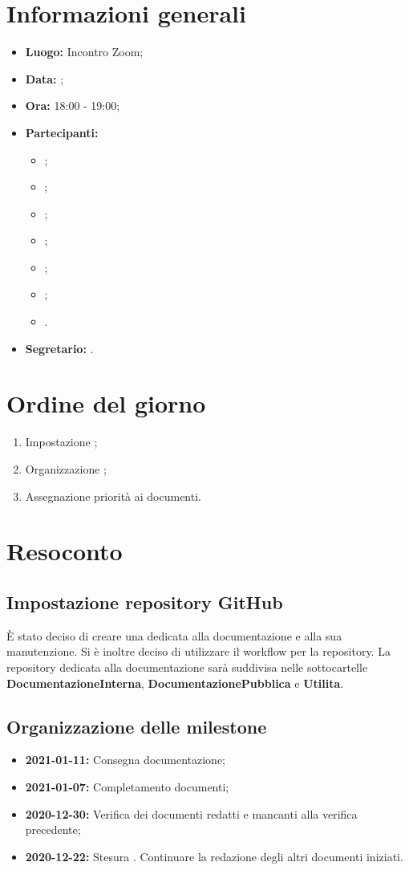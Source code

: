 \section{Informazioni generali}
\begin{itemize}
\item \textbf{Luogo:} Incontro Zoom;
\item \textbf{Data:} \Data;
\item \textbf{Ora:} 18:00 - 19:00;
\item \textbf{Partecipanti:}
	\begin{itemize}
		\item \BL{}; 
		\item \FF{};
		\item \MM{}; 
		\item \PC{};
		\item \TG{};
		\item \TL{};
		\item \VD{}.
	\end{itemize} 
\item \textbf{Segretario:} \PC{}.
\end{itemize}

\section{Ordine del giorno}
\begin{enumerate}
 \item Impostazione  ;
 \item Organizzazione ;
 \item Assegnazione priorità ai documenti.
\end{enumerate}

\section{Resoconto}
\subsection{Impostazione repository GitHub}
È stato deciso di creare una  dedicata alla documentazione e alla sua manutenzione. Si è inoltre deciso di utilizzare il workflow  per la repository. La repository dedicata alla documentazione sarà suddivisa nelle sottocartelle \textbf{DocumentazioneInterna}, \textbf{DocumentazionePubblica} e \textbf{Utilita}.
\subsection{Organizzazione delle milestone}
 \begin{itemize}
  \item \textbf{2021-01-11:} Consegna documentazione;
  \item \textbf{2021-01-07:} Completamento documenti;
  \item \textbf{2020-12-30:} Verifica dei documenti redatti e mancanti alla verifica precedente;
  \item \textbf{2020-12-22:} Stesura \PdP. Continuare la redazione degli altri documenti iniziati.
 \end{itemize}
